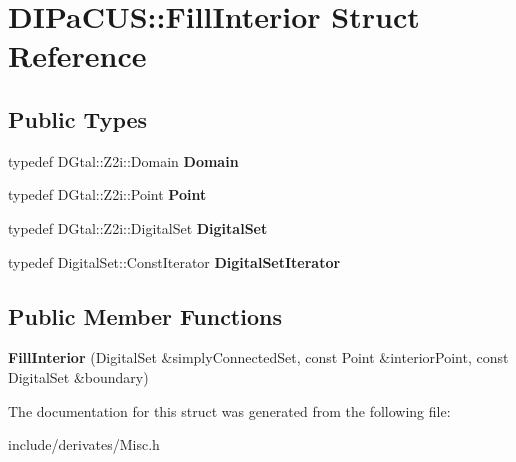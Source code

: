 \hypertarget{structDIPaCUS_1_1FillInterior}{}\section{D\+I\+Pa\+C\+US\+:\+:Fill\+Interior Struct Reference}
\label{structDIPaCUS_1_1FillInterior}
\subsection*{Public Types}
\begin{DoxyCompactItemize}
\item 
\mbox{\label{structDIPaCUS_1_1FillInterior_ab038a816d84525a34374a07e1e85cd6a}} 
typedef D\+Gtal\+::\+Z2i\+::\+Domain {\bfseries Domain}
\item 
\mbox{\label{structDIPaCUS_1_1FillInterior_aa07e5109b57451a6a2513db7954fcd4f}} 
typedef D\+Gtal\+::\+Z2i\+::\+Point {\bfseries Point}
\item 
\mbox{\label{structDIPaCUS_1_1FillInterior_a5c7dd54c421be813c7d98333e9931d51}} 
typedef D\+Gtal\+::\+Z2i\+::\+Digital\+Set {\bfseries Digital\+Set}
\item 
\mbox{\label{structDIPaCUS_1_1FillInterior_abb7e6fa076e4c938252e3b8dc700dba6}} 
typedef Digital\+Set\+::\+Const\+Iterator {\bfseries Digital\+Set\+Iterator}
\end{DoxyCompactItemize}
\subsection*{Public Member Functions}
\begin{DoxyCompactItemize}
\item 
\mbox{\label{structDIPaCUS_1_1FillInterior_a9bccccd1c001e4710adbecd33ecde5b9}} 
{\bfseries Fill\+Interior} (Digital\+Set \&simply\+Connected\+Set, const Point \&interior\+Point, const Digital\+Set \&boundary)
\end{DoxyCompactItemize}


The documentation for this struct was generated from the following file\+:\begin{DoxyCompactItemize}
\item 
include/derivates/Misc.\+h\end{DoxyCompactItemize}

